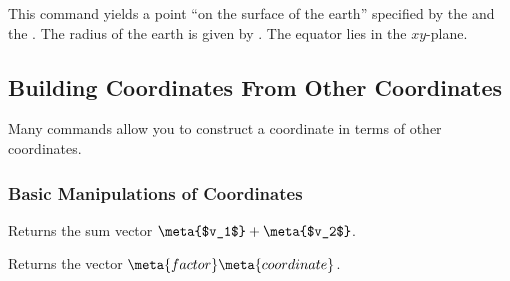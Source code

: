 \begin{command}{\pgfpointspherical{}}
  This command yields a point ``on the surface of the earth''
  specified by the  and the . The
  radius of the earth is given by . The equator lies in
  the $xy$-plane.
\begin{codeexample}[]
\end{codeexample}
\end{command}



\subsection{Building Coordinates From Other Coordinates}

Many commands allow you to construct a coordinate in terms of other
coordinates.


\subsubsection{Basic Manipulations of Coordinates}

\begin{command}{\pgfpointadd{}}
  Returns the sum vector $\meta{$v_1$} + \meta{$v_2$}$.
\begin{codeexample}[]
\end{codeexample}
\end{command}

\begin{command}{\pgfpointscale{}}
  Returns the vector $\meta{factor}\meta{coordinate}$.
\begin{codeexample}[]
\end{codeexample}
\end{command}

